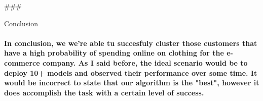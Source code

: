 \documentclass[11pt]{article}
\begin{document}
    \#\#\#

Conclusion

    \paragraph{In conclusion, we we're able tu succesfuly cluster those
customers that have a high probability of spending online on clothing
for the e-commerce company. As I said before, the ideal scenario would
be to deploy 10+ models and observed their performance over some time.
It would be incorrect to state that our algorithm is the "best", however
it does accomplish the task with a certain level of
success.}\label{in-conclusion-we-were-able-tu-succesfuly-cluster-those-customers-that-have-a-high-probability-of-spending-online-on-clothing-for-the-e-commerce-company.-as-i-said-before-the-ideal-scenario-would-be-to-deploy-10-models-and-observed-their-performance-over-some-time.-it-would-be-incorrect-to-state-that-our-algorithm-is-the-best-however-it-does-accomplish-the-task-with-a-certain-level-of-success.}


    
    
    
    
\end{document}
